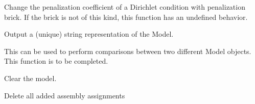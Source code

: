 \documentclass[a4paper,11pt,english]{sphinxmanual}
\begin{document}
\begin{fulllineitems}
\begin{fulllineitems}
\end{fulllineitems}


\begin{fulllineitems}
\label{\detokenize{python/cmdref_Model:getfem.Model.change_penalization_coeff}}
Change the penalization coefficient of a Dirichlet condition with
penalization brick. If the brick is not of this kind, this
function has an undefined behavior.

\end{fulllineitems}


\begin{fulllineitems}
\label{\detokenize{python/cmdref_Model:getfem.Model.char}}
Output a (unique) string representation of the Model.

This can be used to perform comparisons between two
different Model objects.
This function is to be completed.

\end{fulllineitems}


\begin{fulllineitems}
\label{\detokenize{python/cmdref_Model:getfem.Model.clear}}
Clear the model.

\end{fulllineitems}


\begin{fulllineitems}
\label{\detokenize{python/cmdref_Model:getfem.Model.clear_assembly_assignment}}
Delete all added assembly assignments

\end{fulllineitems}



\end{fulllineitems}
\end{document}
